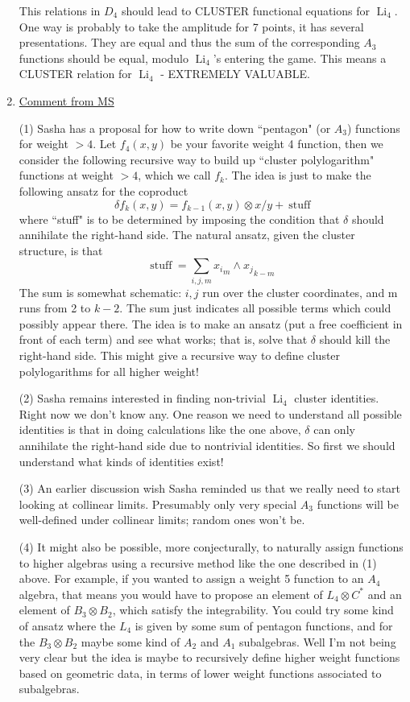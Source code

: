 \documentclass[12pt]{article}
\DeclareMathOperator{\Li}{Li}
\begin{document}
\begin{enumerate}
This relations in $D_4$ should lead to CLUSTER  functional equations for $\Li_4$. 
One way is probably to take the amplitude for 7 points, it has several presentations. 
They are equal and thus the sum of the corresponding $A_3$ functions should be equal, 
modulo $\Li_4$'s entering the game. This means a CLUSTER relation for $\Li_4$ - 
EXTREMELY VALUABLE. 

\item \underline{Comment from MS}

(1) Sasha has a proposal for
how to write down ``pentagon" (or $A_3$) functions for weight $> 4$.  Let
$f_4(x,y)$ be your favorite weight 4 function, then we consider the
following recursive way to build up ``cluster polylogarithm" functions
at weight $> 4$, which we call $f_k$.  The idea is just to make the
following ansatz for the coproduct
$$
\delta f_k(x,y) = f_{k-1}(x,y) \otimes x/y + ~\text{stuff}
$$
where ``stuff" is to be determined by imposing the condition that
$\delta$ should annihilate the right-hand side.  The natural ansatz,
given the cluster structure, is that
$$
\text{stuff}~ = \sum_{i,j,m} {x_i}_m \wedge {x_j}_{k-m}
$$
The sum is somewhat schematic:  $i,j$ run over the cluster coordinates,
and m runs from 2 to $k-2$.  The sum just indicates all possible terms
which could possibly appear there.  The idea is to make an ansatz (put
a free coefficient in front of each term) and see what works; that is,
solve that $\delta$ should kill the right-hand side.  This might give a
recursive way to define cluster polylogarithms for all higher weight!

(2) Sasha remains interested in finding
non-trivial $\Li_4$ cluster identities.  Right now we don't know any.
One reason we need to understand all possible identities is that in
doing calculations like the one above, $\delta$ can only annihilate the
right-hand side due to nontrivial identities.  So first we should
understand what kinds of identities exist!

(3) An earlier discussion wish Sasha reminded us that we really need
to start looking at collinear limits.  Presumably only very special $A_3$
functions will be well-defined under collinear limits; random ones
won't be.

(4) It might also be possible, more conjecturally, to naturally assign
functions to higher algebras using a recursive method like the one
described in (1) above.  For example, if you wanted to assign a weight
5 function to an $A_4$ algebra, that means you would have to propose an
element of $L_4 \otimes C^*$ and an element of $B_3 \otimes B_2$, which
satisfy the integrability.  You could try some kind of ansatz where
the $L_4$ is given by some sum of pentagon functions, and for the $B_3
\otimes B_2$ maybe some kind of $A_2$ and $A_1$ subalgebras.  Well I'm not
being very clear but the idea is maybe to recursively define higher
weight functions based on geometric data, in terms of lower weight
functions associated to subalgebras.


\end{enumerate}
\end{document}

